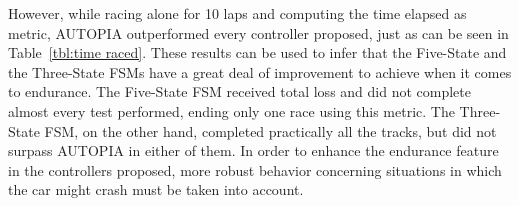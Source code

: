 	However, while racing alone for 10 laps and computing the time elapsed as metric, AUTOPIA outperformed every controller proposed, just as can be seen in Table~\ref{tbl:time raced}. These results can be used to infer that the Five-State and the Three-State FSMs have a great deal of improvement to achieve when it comes to endurance. The Five-State FSM received total loss and did not complete almost every test performed, ending only one race using this metric. The Three-State FSM, on the other hand, completed practically all the tracks, but did not surpass AUTOPIA in either of them. In order to enhance the endurance feature in the controllers proposed, more robust behavior concerning situations in which the car might crash must be taken into account.	
	
